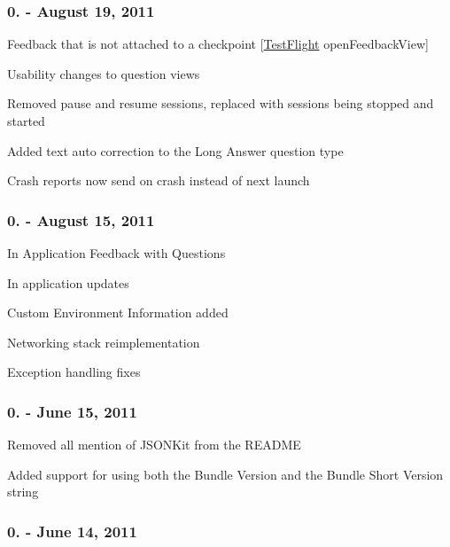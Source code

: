 \subsubsection*{0. -\/ August 19, 2011}


\begin{DoxyItemize}
\item Feedback that is not attached to a checkpoint \mbox{[}\hyperlink{interface_test_flight}{Test\-Flight} open\-Feedback\-View\mbox{]}
\item Usability changes to question views
\item Removed pause and resume sessions, replaced with sessions being stopped and started
\item Added text auto correction to the Long Answer question type
\item Crash reports now send on crash instead of next launch
\end{DoxyItemize}

\subsubsection*{0. -\/ August 15, 2011}


\begin{DoxyItemize}
\item In Application Feedback with Questions
\item In application updates
\item Custom Environment Information added
\item Networking stack reimplementation
\item Exception handling fixes
\end{DoxyItemize}

\subsubsection*{0. -\/ June 15, 2011}


\begin{DoxyItemize}
\item Removed all mention of J\-S\-O\-N\-Kit from the R\-E\-A\-D\-M\-E
\item Added support for using both the Bundle Version and the Bundle Short Version string
\end{DoxyItemize}

\subsubsection*{0. -\/ June 14, 2011}


